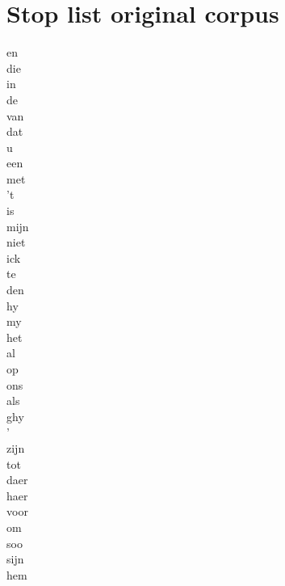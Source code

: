 \chapter{Stop list original corpus}

\begin{minipage}[t]{0.25\textwidth}
	en\\
	die\\
	in\\
	de\\
	van\\
	dat\\
	u\\
	een\\
	met\\
	't\\
	is\\
	mijn\\
	niet\\
	ick\\
	te\\
	den\\
	hy\\
	my\\
	het\\
	al\\
	op\\
	ons\\
	als\\
	ghy\\
	’\\
	zijn\\
	tot\\
	daer\\
	haer\\
	voor\\
	om\\
	soo\\
	sijn\\
	hem
\end{minipage}
